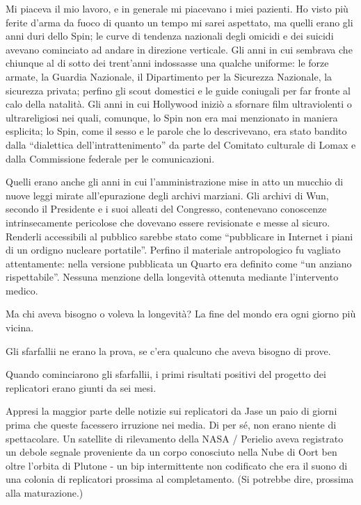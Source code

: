 Mi piaceva il mio lavoro, e in generale mi piacevano i miei pazienti. Ho
visto più ferite d'arma da fuoco di quanto un tempo mi sarei aspettato,
ma quelli erano gli anni duri dello Spin; le curve di tendenza nazionali
degli omicidi e dei suicidi avevano cominciato ad andare in direzione
verticale. Gli anni in cui sembrava che chiunque al di sotto dei
trent'anni indossasse una qualche uniforme: le forze armate, la Guardia
Nazionale, il Dipartimento per la Sicurezza Nazionale, la sicurezza
privata; perfino gli scout domestici e le guide coniugali per far fronte
al calo della natalità. Gli anni in cui Hollywood iniziò a sfornare film
ultraviolenti o ultrareligiosi nei quali, comunque, lo Spin non era mai
menzionato in maniera esplicita; lo Spin, come il sesso e le parole che
lo descrivevano, era stato bandito dalla ``dialettica
dell'intrattenimento'' da parte del Comitato culturale di Lomax e dalla
Commissione federale per le comunicazioni.

Quelli erano anche gli anni in cui l'amministrazione mise in atto un
mucchio di nuove leggi mirate all'epurazione degli archivi marziani. Gli
archivi di Wun, secondo il Presidente e i suoi alleati del Congresso,
contenevano conoscenze intrinsecamente pericolose che dovevano essere
revisionate e messe al sicuro. Renderli accessibili al pubblico sarebbe
stato come ``pubblicare in Internet i piani di un ordigno nucleare
portatile''. Perfino il materiale antropologico fu vagliato
attentamente: nella versione pubblicata un Quarto era definito come ``un
anziano rispettabile''. Nessuna menzione della longevità ottenuta
mediante l'intervento medico.

Ma chi aveva bisogno o voleva la longevità? La fine del mondo era ogni
giorno più vicina.

Gli sfarfallii ne erano la prova, se c'era qualcuno che aveva bisogno di
prove.

\separatorefiori

Quando cominciarono gli sfarfallii, i primi risultati positivi del
progetto dei replicatori erano giunti da sei mesi.

Appresi la maggior parte delle notizie sui replicatori da Jase un paio
di giorni prima che queste facessero irruzione nei media. Di per sé, non
erano niente di spettacolare. Un satellite di rilevamento della NASA /
Perielio aveva registrato un debole segnale proveniente da un corpo
conosciuto nella Nube di Oort ben oltre l'orbita di Plutone - un bip
intermittente non codificato che era il suono di una colonia di
replicatori prossima al completamento. (Si potrebbe dire, prossima alla
maturazione.)

